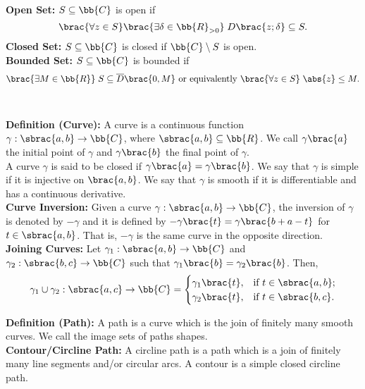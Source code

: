 \documentclass[1pt]{article}
\begin{document}
\newpage
\textbf{Open Set:} $S \subseteq \bb{C}$ is open if 
$$\brac{\forall z \in S}\brac{\exists \delta \in \bb{R}_{>0}} \; D\brac{z;\delta} \subseteq S.$$
\textbf{Closed Set:} $S \subseteq \bb{C}$ is closed if $\bb{C} \setminus S$ is open. \\[\baselineskip]
\textbf{Bounded Set:} $S \subseteq \bb{C}$ is bounded if 
$$\brac{\exists M \in \bb{R}} \; S \subseteq \overline{D}\brac{0,M} \text{ or equivalently } \brac{\forall z \in S} \; \abs{z} \leq M.$$
\\
\\
\textbf{Definition (Curve):} A curve is a continuous function $\gamma : \sbrac{a,b} \rightarrow \bb{C}$, where $\sbrac{a,b} \subseteq \bb{R}$.
We call $\gamma\brac{a}$ the initial point of $\gamma$ and $\gamma\brac{b}$ the final point of $\gamma$. \\[\baselineskip]

A curve $\gamma$ is said to be closed if $\gamma\brac{a} = \gamma\brac{b}$. We say that $\gamma$ is simple if it is injective on $\brac{a,b}$.
We say that $\gamma$ is smooth if it is differentiable and has a continuous derivative. \\[\baselineskip]

\textbf{Curve Inversion:} Given a curve $\gamma : \sbrac{a,b} \rightarrow \bb{C}$, the inversion of $\gamma$ is denoted by $-\gamma$ and 
it is defined by $-\gamma\brac{t} = \gamma\brac{b+a-t}$ for $t \in \sbrac{a,b}$. 
That is, $-\gamma$ is the same curve in the opposite direction. \\[\baselineskip]

\textbf{Joining Curves:} Let $\gamma_1 : \sbrac{a,b} \rightarrow \bb{C}$  and $\gamma_2 : \sbrac{b,c} \rightarrow \bb{C}$ such that
$\gamma_1\brac{b} = \gamma_2\brac{b}$. Then, 
\[
   \gamma_1 \cup \gamma_2 : \sbrac{a,c} \rightarrow \bb{C} = 
   \begin{cases}
      \gamma_1\brac{t}, & \text{if } t \in \sbrac{a,b}; \\
      \gamma_2\brac{t}, & \text{if } t \in \sbrac{b,c}.
   \end{cases}
\]

\textbf{Definition (Path):} A path is a curve which is the join of finitely many smooth curves. We call the image sets of paths shapes. \\[\baselineskip]

\textbf{Contour/Circline Path:} A circline path is a path which is a join of finitely many line segments and/or circular arcs. A contour
is a simple closed circline path. \\[\baselineskip]
\end{document}
